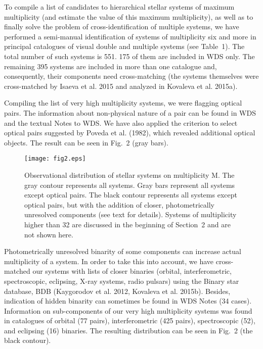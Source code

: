 \documentclass[10pt,a4paper,twoside]{article}
\begin{document}

To compile a list of candidates to hierarchical stellar systems of
maximum multiplicity (and estimate the value of this maximum
multiplicity), as well as to finally solve the problem of
cross-identification of multiple systems, we have performed a
semi-manual identification of systems of multiplicity six and more
in principal catalogues of visual double and multiple systems (see
Table~1). The total number of such systems is 551. 175 of them are
included in WDS only.
The remaining 395 systems are included in more than one catalogue
and, consequently, their components need cross-matching (the
systems themselves were cross-matched by Isaeva et al. 2015 and
analyzed in Kovaleva et al. 2015a).

Compiling the list of very high multiplicity systems, we were
flagging optical pairs. The information about non-physical nature
of a pair can be found in WDS and the textual Notes to WDS. We
have also applied the criterion to select optical pairs suggested
by Poveda et al. (1982), which revealed additional optical
objects. The result can be seen in Fig.~2 (gray bars).

\begin{figure}
\texttt{[image: fig2.eps]}
\caption{Observational distribution of stellar systems on
multiplicity M. The gray contour represents all systems. Gray bars
represent all systems except optical pairs. The black contour
represents all systems except optical pairs, but with the addition
of closer, photometrically unresolved components (see text for
details). Systems of multiplicity higher than 32 are discussed in
the beginning of Section~2 and are not shown here.}
\label{fig:optical}
\end{figure}

Photometrically unresolved binarity of some components can
increase actual multiplicity of a system. In order to take this
into account, we have cross-matched our systems with lists of
closer binaries (orbital, interferometric, spectroscopic,
eclipsing, X-ray systems, radio pulsars) using the Binary star
database, BDB (Kaygorodov et al. 2012, Kovaleva et al. 2015b).
Besides, indication of hidden binarity can sometimes be found in
WDS Notes (34 cases). Information on sub-components of our very
high multiplicity systems was found in catalogues of orbital (77
pairs), interferometric (425 pairs), spectroscopic (52), and
eclipsing (16) binaries. The resulting distribution can be seen in
Fig.~2 (the black contour).
\end{document}
